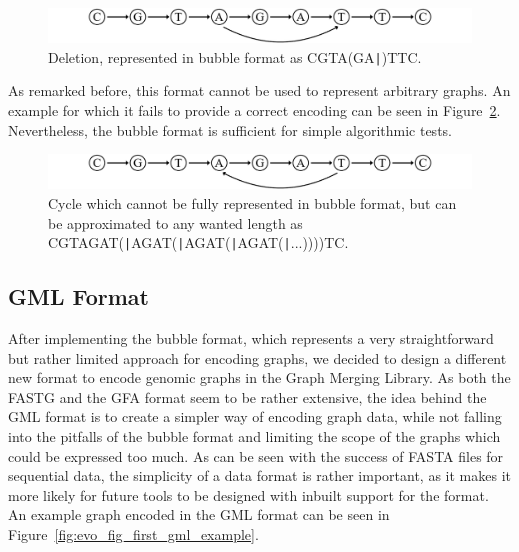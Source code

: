 \documentclass[a4paper,12pt,twoside,BCOR=10mm]{scrbook}
\def\pipe{\texttt{|}}
\begin{document}
\begin{figure}[!htb]
\centering
\includegraphics[width=\textwidth]{evo_fig_STPUinsertion_f.pdf}
\caption[Deletion in bubble format]{Deletion, represented in bubble format as \textup{CGTA(GA\pipe )TTC}.} \label{fig:evo_fig_STPUinsertion_f}
\end{figure}

As remarked before, this format cannot be used to represent arbitrary graphs.
An example for which it fails to provide a correct encoding can be seen in Figure~\ref{fig:evo_fig_STPUcycle_f}.
Nevertheless, the bubble format is sufficient for simple algorithmic tests.

\begin{figure}[!htb]
\centering
\includegraphics[width=\textwidth]{evo_fig_STPUcycle_f.pdf}
\caption[Cycle in bubble format]{Cycle which cannot be fully represented in bubble format, but can be approximated to any wanted length as \textup{CGTAGAT(\pipe AGAT(\pipe AGAT(\pipe AGAT(\pipe ...))))TC}.} \label{fig:evo_fig_STPUcycle_f}
\end{figure}

\subsection{GML Format}
\label{sec:def:gml_format}

After implementing the bubble format, which represents a very straightforward but rather
limited approach for encoding graphs,
we decided to design a different new format to encode genomic graphs in the Graph Merging Library.
As both the FASTG and the GFA format seem to be rather extensive,
the idea behind the GML format is to create a simpler way of encoding graph data,
while not falling into the pitfalls of the bubble format and limiting the scope of
the graphs which could be expressed too much.
As can be seen with the success of FASTA files for sequential data,
the simplicity of a data format is rather important, as it makes it more likely
for future tools to be designed with inbuilt support for the format. \\
An example graph encoded in the GML format can be seen in Figure~\ref{fig:evo_fig_first_gml_example}.
\end{document}
